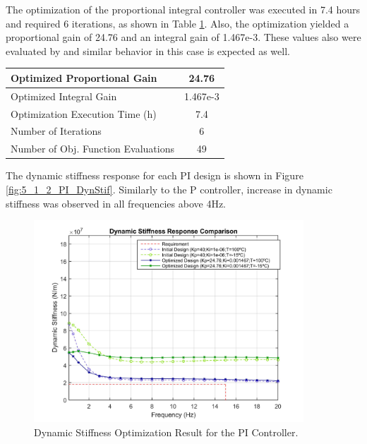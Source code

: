 The optimization of the proportional integral controller was executed in 7.4 hours and required 6 iterations, as shown in Table \ref{table:5_2_2_PIContExecution}. Also, the optimization yielded a proportional gain of 24.76 and an integral gain of 1.467e-3. These values also were evaluated by  and similar behavior in this case is expected as well. 

\begin{table}[H]
	\label{table:5_2_2_PIContExecution}
	\centering
	\resizebox{7cm}{!} {
		\begin{tabular}{|l|c|}
			\hline
			Optimized Proportional Gain & 24.76 \\ \hline
			Optimized Integral Gain & 1.467e-3 \\ \hline
			Optimization Execution Time (h) & 7.4 \\ \hline
			Number of Iterations & 6 \\ \hline	
			Number of Obj. Function Evaluations & 49 \\ \hline	
	\end{tabular}}
\end{table}

The  dynamic stiffness response for each PI design is shown in Figure \ref{fig:5_1_2_PI_DynStif}. Similarly to the P controller, increase in dynamic stiffness was observed in all frequencies above 4Hz.

\begin{figure}[H]
	\centering
	\centerline{\includegraphics[width=0.9\textwidth]{Figuras/5.OptimizationResults/5-2-2-PI-DynamicStiffnessComparison.jpg}}
	\caption{Dynamic Stiffness Optimization Result for the PI Controller.}
	\label{fig:5_2_2_PI_DynStif}
\end{figure}

